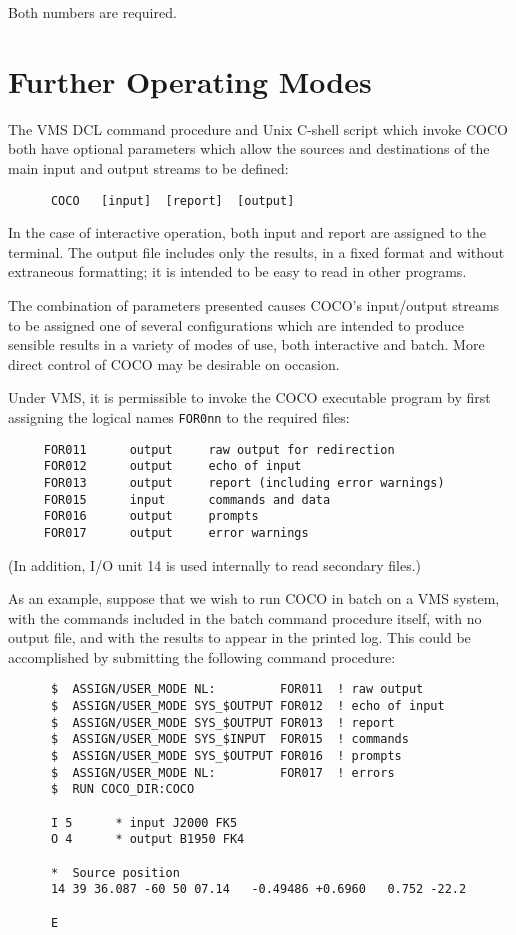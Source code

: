 Both numbers are required.

\section{Further Operating Modes}

The VMS DCL command procedure and Unix C-shell script which
invoke COCO
both have optional parameters which
allow the sources and destinations of the main input and
output streams to be defined:
\begin{verbatim}
      COCO   [input]  [report]  [output]
\end{verbatim}

In the case of interactive operation, both input and report
are assigned to the terminal.
The output file includes only the results, in a fixed format and
without extraneous formatting; it is intended to be
easy to read in other programs.

The combination of parameters presented causes COCO's
input/output streams to be assigned one of several configurations
which are intended to produce sensible results in a variety
of modes of use, both interactive and batch.
More direct control of COCO may be desirable on occasion.

Under VMS, it is permissible to invoke the COCO executable program
by first assigning the logical names {\tt FOR0nn} to the required
files:
\begin{verbatim}
     FOR011      output     raw output for redirection
     FOR012      output     echo of input
     FOR013      output     report (including error warnings)
     FOR015      input      commands and data
     FOR016      output     prompts
     FOR017      output     error warnings
\end{verbatim}

(In addition, I/O unit 14 is used internally to read secondary
files.)

As an example, suppose that we wish to run COCO in batch on a VMS
system, with
the commands included in the batch command procedure itself,
with no output file, and with the results to appear in the
printed log.
This could be accomplished by submitting the following command procedure:
\begin{verbatim}
      $  ASSIGN/USER_MODE NL:         FOR011  ! raw output
      $  ASSIGN/USER_MODE SYS_$OUTPUT FOR012  ! echo of input
      $  ASSIGN/USER_MODE SYS_$OUTPUT FOR013  ! report
      $  ASSIGN/USER_MODE SYS_$INPUT  FOR015  ! commands
      $  ASSIGN/USER_MODE SYS_$OUTPUT FOR016  ! prompts
      $  ASSIGN/USER_MODE NL:         FOR017  ! errors
      $  RUN COCO_DIR:COCO

      I 5      * input J2000 FK5
      O 4      * output B1950 FK4

      *  Source position
      14 39 36.087 -60 50 07.14   -0.49486 +0.6960   0.752 -22.2

      E
\end{verbatim}

